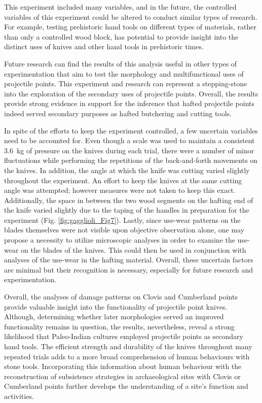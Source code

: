 This experiment included many variables, and in the future, the controlled variables of this experiment could be altered to conduct similar types of research. For example, testing prehistoric hand tools on different types of materials, rather than only a controlled wood block, has potential to provide insight into the distinct uses of knives and other hand tools in prehistoric times. 

Future research can find the results of this analysis useful in other types of experimentation that aim to test the morphology and multifunctional uses of projectile points. This experiment and research can represent a stepping-stone into the exploration of the secondary uses of projectile points. Overall, the results provide strong evidence in support for the inference that hafted projectile points indeed served secondary purposes as hafted butchering and cutting tools. 


In spite of the efforts to keep the experiment controlled, a few uncertain variables need to be accounted for. Even though a scale was used to maintain a consistent \SI{3.6}{\kilogram} of pressure on the knives during each trial, there were a number of minor fluctuations while performing the repetitions of the back-and-forth movements on the knives. In addition, the angle at which the knife was cutting varied slightly throughout the experiment. 
		An effort to keep the knives at the same cutting angle was attempted; however measures were not taken to keep this exact. Additionally, the space in between the 
	two wood segments on the hafting end of the knife varied slightly due to the taping of the handles in preparation for the experiment (Fig. \ref{fig:gagglioli_Fig7}). Lastly, since use-wear patterns on the blades themselves were not visible upon objective observation alone, one may propose a necessity to utilize microscopic analyses in order to examine the use-wear on the blades of the knives. This could then be used in conjunction with analyses of the use-wear in the hafting material. Overall, these uncertain factors are minimal but their recognition is necessary, especially for future research and experimentation.
	
	
Overall, the analyses of damage patterns on Clovis and Cumberland points provide valuable insight into the functionality of projectile point knives. Although, determining whether later morphologies served an improved functionality remains in question, the results, nevertheless, reveal a strong likelihood that Paleo-Indian cultures employed projectile points as secondary hand tools. The efficient strength and durability of the knives throughout many repeated trials adds to a more broad comprehension of human behaviours with stone tools. Incorporating this information about human behaviour with the reconstruction of subsistence strategies in archaeological sites with Clovis or Cumberland points further develops the understanding of a site’s function and activities. 

